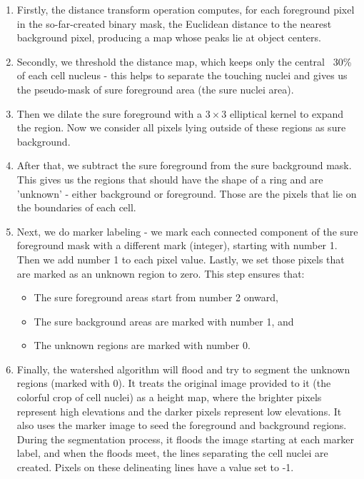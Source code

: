 \begin{enumerate}
    \item Firstly, the distance transform operation computes, for each foreground pixel in the so-far-created binary mask, the Euclidean distance to the nearest background pixel, producing a map whose peaks lie at object centers.
    \item Secondly, we threshold the distance map, which keeps only the central ~30\% of each cell nucleus - this helps to separate the touching nuclei and gives us the pseudo-mask of sure foreground area (the sure nuclei area).
    \item Then we dilate the sure foreground with a $3\!\times\!3$ elliptical kernel to expand the region. Now we consider all pixels lying outside of these regions as sure background.
    \item After that, we subtract the sure foreground from the sure background mask. This gives us the regions that should have the shape of a ring and are 'unknown' - either background or foreground. Those are the pixels that lie on the boundaries of each cell.
    \item Next, we do marker labeling - we mark each connected component of the sure foreground mask with a different mark (integer), starting with number 1. Then we add number 1 to each pixel value. Lastly, we set those pixels that are marked as an unknown region to zero. This step ensures that:
    \begin{itemize}
        \item The sure foreground areas start from number 2 onward,
        \item The sure background areas are marked with number 1, and
        \item The unknown regions are marked with number 0.
    \end{itemize}
    \item Finally, the watershed algorithm will flood and try to segment the unknown regions (marked with 0). It treats the original image provided to it (the colorful crop of cell nuclei) as a height map, where the brighter pixels represent high elevations and the darker pixels represent low elevations. It also uses the marker image to seed the foreground and background regions. During the segmentation process, it floods the image starting at each marker label, and when the floods meet, the lines separating the cell nuclei are created. Pixels on these delineating lines have a value set to -1.
\end{enumerate}

